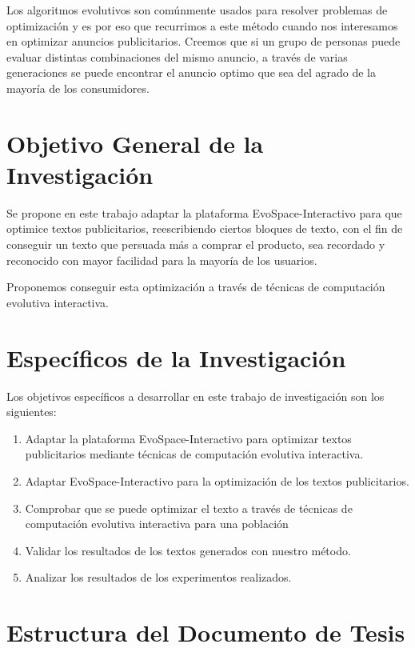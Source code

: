 Los algoritmos evolutivos son comúnmente usados para resolver problemas de optimización \cite{jong2006evolutionary} y es por eso que recurrimos a este método cuando nos interesamos en optimizar anuncios publicitarios. Creemos que si un grupo de personas puede evaluar distintas combinaciones del mismo anuncio, a través de varias generaciones se puede encontrar el anuncio optimo que sea del agrado de la mayoría de los consumidores.



\section{Objetivo General de la Investigación}

Se propone en este trabajo adaptar la plataforma EvoSpace-Interactivo para que optimice textos publicitarios, reescribiendo ciertos bloques de texto, con el fin de conseguir un texto que persuada más a comprar el producto, sea recordado y reconocido con mayor facilidad para la mayoría de  los usuarios.

Proponemos conseguir esta optimización a través de técnicas de computación evolutiva interactiva.

\section{Específicos de la Investigación}

Los objetivos específicos a desarrollar en este trabajo de investigación son los siguientes:

\begin{enumerate}
\item Adaptar la plataforma EvoSpace-Interactivo para optimizar textos publicitarios mediante técnicas de computación evolutiva interactiva.
\item Adaptar EvoSpace-Interactivo para la optimización de los textos publicitarios.
\item Comprobar que se puede optimizar el texto a través de técnicas de computación evolutiva interactiva para una población
\item Validar los resultados de los textos generados con nuestro método.
\item Analizar los resultados de los experimentos realizados.
\end{enumerate}

\section{Estructura del Documento de Tesis}

